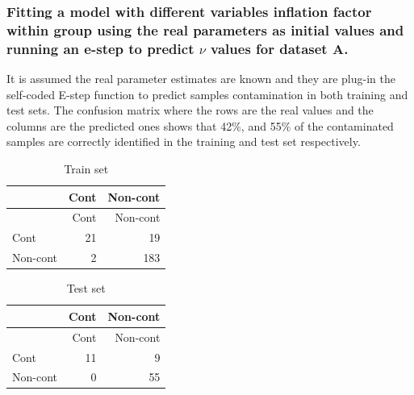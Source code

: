 \documentclass[
]{article}
\begin{document}
\hypertarget{fitting-a-model-with-different-variables-inflation-factor-within-group-using-the-real-parameters-as-initial-values-and-running-an-e-step-to-predict-nu-values-for-dataset-a.}{%
\subsubsection{\texorpdfstring{Fitting a model with different variables
inflation factor within group using the real parameters as initial
values and running an e-step to predict \(\nu\) values for dataset
A.}{Fitting a model with different variables inflation factor within group using the real parameters as initial values and running an e-step to predict \textbackslash nu values for dataset A.}}\label{fitting-a-model-with-different-variables-inflation-factor-within-group-using-the-real-parameters-as-initial-values-and-running-an-e-step-to-predict-nu-values-for-dataset-a.}}

It is assumed the real parameter estimates are known and they are
plug-in the self-coded E-step function to predict samples contamination
in both training and test sets. The confusion matrix where the rows are
the real values and the columns are the predicted ones shows that
42\(\%\), and 55\(\%\) of the contaminated samples are correctly
identified in the training and test set respectively.

\begin{longtable}[]{@{}lrr@{}}
\caption{Train set}\tabularnewline
\toprule\noalign{}
& Cont & Non-cont \\
\midrule\noalign{}
\endfirsthead
\toprule\noalign{}
& Cont & Non-cont \\
\midrule\noalign{}
\endhead
\bottomrule\noalign{}
\endlastfoot
Cont & 21 & 19 \\
Non-cont & 2 & 183 \\
\end{longtable}

\begin{longtable}[]{@{}lrr@{}}
\caption{Test set}\tabularnewline
\toprule\noalign{}
& Cont & Non-cont \\
\midrule\noalign{}
\endfirsthead
\toprule\noalign{}
& Cont & Non-cont \\
\midrule\noalign{}
\endhead
\bottomrule\noalign{}
\endlastfoot
Cont & 11 & 9 \\
Non-cont & 0 & 55 \\
\end{longtable}
\end{document}
